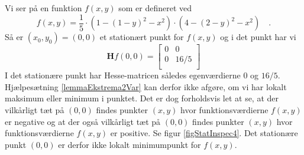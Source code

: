\begin{example} \label{exampStatInspec4}
Vi ser på en  funktion $f(x,y)$ som er defineret ved
\begin{equation}
f(x,y) =  \frac{1}{5}\cdot \left( 1 - (1-y)^{2} -x^{2}\right) \cdot \left( 4 - (2-y)^{2} - x^{2} \right) \quad .
\end{equation}
Så er $(x_{0}, y_{0}) = (0, 0) $ et stationært punkt for $f(x,y)$ og i det punkt har vi
\begin{equation}
\bm{H}f(0,0) = \left[
                                                                           \begin{array}{cc}
                                                                             0 & 0 \\
                                                                             0 & 16/5\\
                                                                           \end{array}
                                                                         \right]
\end{equation}
I det stationære punkt har Hesse-matricen således egenværdierne $0$ og $16/5$. Hjælpesætning \ref{lemmaEkstrema2Var} kan derfor ikke afgøre, om vi har lokalt maksimum eller minimum i punktet.  Det er dog forholdsvis let at se, at der vilkårligt tæt på $(0,0)$ findes punkter $(x,y)$ hvor funktionsværdierne $f(x,y)$ er negative og at der også vilkårligt tæt på $(0,0)$ findes punkter $(x,y)$ hvor funktionsværdierne $f(x,y)$ er positive. Se figur \ref{figStatInspec4}. Det stationære punkt $(0,0)$ er derfor ikke lokalt minimumpunkt for $f(x,y)$.
\end{example}

